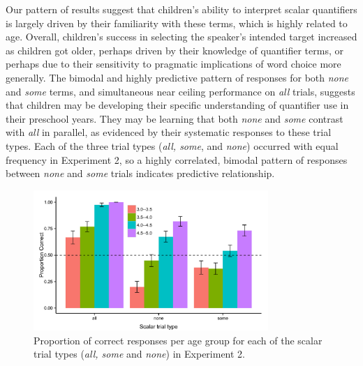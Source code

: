 \documentclass[10pt,letterpaper]{article}
\begin{document}
Our pattern of results suggest that children's ability to interpret scalar quantifiers is largely driven by their familiarity with these terms, which is highly related to age.  Overall, children's success in selecting the speaker's intended target increased as children got older, perhaps driven by their knowledge of quantifier terms, or perhaps due to their sensitivity to pragmatic implications of word choice more generally. The bimodal and highly predictive pattern of responses for both \emph{none} and \emph{some} terms, and simultaneous near ceiling performance on \emph{all} trials, suggests that children may be developing their specific understanding of quantifier use in their preschool years. They may be learning that both \emph{none} and \emph{some} contrast with \emph{all} in parallel, as evidenced by their systematic responses to these trial types. Each of the three trial types (\emph{all, some}, and \emph{none}) occurred with equal frequency in Experiment 2, so a highly correlated, bimodal pattern of responses between \emph{none} and \emph{some} trials indicates predictive relationship. 


\begin{figure}[t] 
  \begin{center} 
    \includegraphics[width=3.5in]{figures/implicatures_scalarOnly_clean.pdf} 
    \caption{\label{fig:expt2} Proportion of correct responses per age group for each of the scalar trial types (\emph{all, some} and \emph{none}) in Experiment 2.     }
    \end{center} 
\vspace{-1ex} 
\end{figure}
\end{document}
